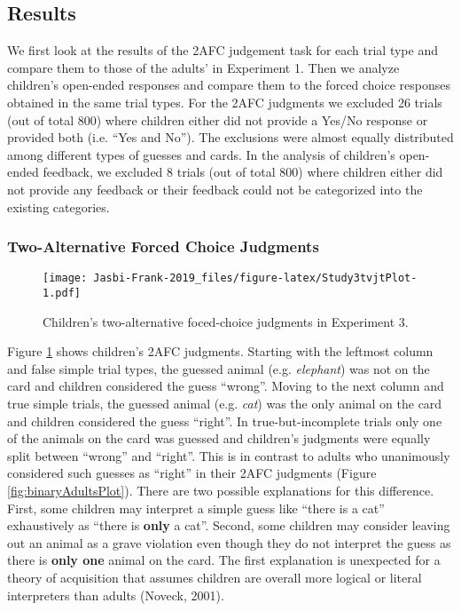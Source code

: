 \documentclass[,man,floatsintext]{apa6}
\begin{document}
\hypertarget{results-2}{%
\subsection{Results}\label{results-2}}

We first look at the results of the 2AFC judgement task for each trial type and compare them to those of the adults' in Experiment 1. Then we analyze children's open-ended responses and compare them to the forced choice responses obtained in the same trial types. For the 2AFC judgments we excluded 26 trials (out of total 800) where children either did not provide a Yes/No response or provided both (i.e. \enquote{Yes and No}). The exclusions were almost equally distributed among different types of guesses and cards. In the analysis of children's open-ended feedback, we excluded 8 trials (out of total 800) where children either did not provide any feedback or their feedback could not be categorized into the existing categories.

\hypertarget{two-alternative-forced-choice-judgments}{%
\subsubsection{Two-Alternative Forced Choice Judgments}\label{two-alternative-forced-choice-judgments}}

\begin{figure}
\centering
\texttt{[image: Jasbi-Frank-2019\_files/figure-latex/Study3tvjtPlot-1.pdf]}
\caption{\label{fig:Study3tvjtPlot}Children's two-alternative foced-choice judgments in Experiment 3.}
\end{figure}

Figure \ref{fig:Study3tvjtPlot} shows children's 2AFC judgments. Starting with the leftmost column and false simple trial types, the guessed animal (e.g. \emph{elephant}) was not on the card and children considered the guess \enquote{wrong}. Moving to the next column and true simple trials, the guessed animal (e.g. \emph{cat}) was the only animal on the card and children considered the guess \enquote{right}. In true-but-incomplete trials only one of the animals on the card was guessed and children's judgments were equally split between \enquote{wrong} and \enquote{right}. This is in contrast to adults who unanimously considered such guesses as \enquote{right} in their 2AFC judgments (Figure \ref{fig:binaryAdultsPlot}). There are two possible explanations for this difference. First, some children may interpret a simple guess like \enquote{there is a cat} exhaustively as \enquote{there is \textbf{only} a cat}. Second, some children may consider leaving out an animal as a grave violation even though they do not interpret the guess as there is \textbf{only one} animal on the card. The first explanation is unexpected for a theory of acquisition that assumes children are overall more logical or literal interpreters than adults (Noveck, 2001).
\end{document}
